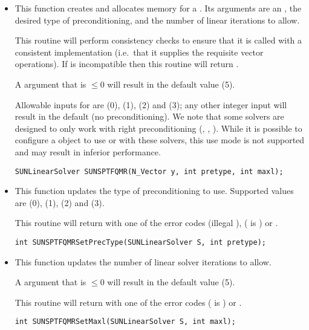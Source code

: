 \begin{itemize}


\item {}

  This function creates and allocates memory for a {\sptfqmr}
  .  Its arguments are an {\nvector}, the desired
  type of preconditioning, and the number of linear iterations to
  allow.

  This routine will perform consistency checks to ensure that it is
  called with a consistent {\nvector} implementation (i.e.~that it
  supplies the requisite vector operations).  If  is
  incompatible then this routine will return .

  A  argument that is $\le0$ will result in the default
  value (5).

  Allowable inputs for  are  (0),
   (1),  (2) and  (3);
  any other integer input will result in the default (no
  preconditioning).  We note that some {\sundials} solvers are
  designed to only work with right preconditioning ({\kinsol}, {\ida},
  {\idas}).  While it is possible to configure a {\sunlinsolsptfqmr}
  object to use  or  with these solvers,
  this use mode is not supported and may result in inferior
  performance.

  \verb|SUNLinearSolver SUNSPTFQMR(N_Vector y, int pretype, int maxl);|


\item {}

  This function updates the type of preconditioning to use.  Supported
  values are  (0),  (1),
   (2) and  (3).  

  This routine will return with one of the error codes
   (illegal ), 
  ( is ) or .
  
  \verb|int SUNSPTFQMRSetPrecType(SUNLinearSolver S, int pretype);|


\item {}

  This function updates the number of linear solver iterations to allow.  

  A  argument that is $\le0$ will result in the default
  value (5).

  This routine will return with one of the error codes
   ( is ) or .
  
  \verb|int SUNSPTFQMRSetMaxl(SUNLinearSolver S, int maxl);|

\end{itemize}
